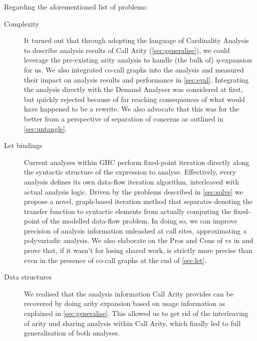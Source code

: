 Regarding the aforementioned list of problems:
\begin{description}
  \item[Complexity]
    It turned out that through adopting the language of Cardinality Analysis to describe analysis results of Call Arity (\cf \cref{sec:generalise}), we could leverage the pre-existing arity analysis to handle (the bulk of) $\eta$-expansion for us.
    We also integrated co-call graphs into the analysis and measured their impact on analysis results and performance in \cref{sec:eval}.
    Integrating the analysis directly with the Demand Analyser was considered at first, but quickly rejected because of far reaching consequences of what would have happened to be a rewrite.
    We also advocate that this was for the better from a perspective of separation of concerns as outlined in \cref{sec:untangle}.
  \item[Let bindings]
    Current analyses within GHC perform fixed-point iteration directly along the syntactic structure of the expression to analyse.
    Effectively, every analysis defines its own data-flow iteration algorithm, interleaved with actual analysis logic.
    Driven by the problems described in \cref{sec:solve} we propose a novel, graph-based iteration method that separates denoting the transfer function to syntactic elements from actually computing the fixed-point of the modelled data-flow problem.
    In doing so, we can improve precision of analysis information unleashed at call sites, approximating a polyvariadic analysis.
    We also elaborate on the Pros and Cons of  vs  in \textcite{card} and prove that, if it wasn't for losing shared work,  is strictly more precise than  even in the presence of co-call graphs at the end of \cref{sec:let}.
  \item[Data structures]
    We realised that the analysis information Call Arity provides can be recovered by doing arity expansion based on usage information as explained in \cref{sec:generalise}.
    This allowed us to get rid of the interleaving of arity und sharing analysis within Call Arity, which finally led to full generalisation of both analyses.
\end{description}
